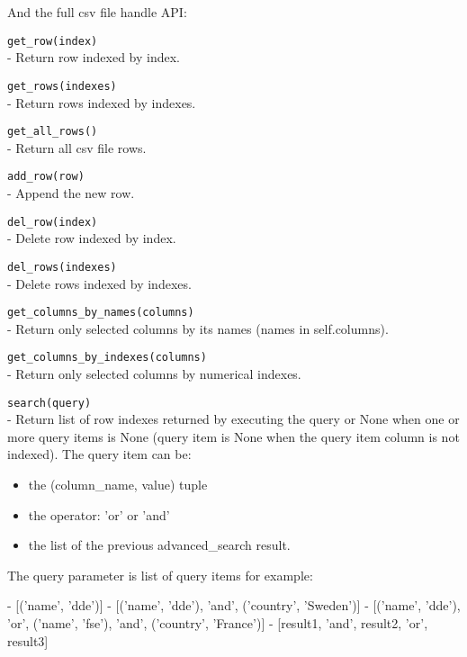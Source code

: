 \documentclass[a4paper]{book}
\begin{document}
And the full csv file handle API:
\begin{api}
  {\tt get\_row(index)}\\
  - Return row indexed by index.

  {\tt get\_rows(indexes)}\\
  - Return rows indexed by indexes.

  {\tt get\_all\_rows()}\\
  - Return all csv file rows.

  {\tt add\_row(row)}\\
  - Append the new row.

  {\tt del\_row(index)}\\
  - Delete row indexed by index.

  {\tt del\_rows(indexes)}\\
  - Delete rows indexed by indexes.

  {\tt get\_columns\_by\_names(columns)}\\
  - Return only selected columns by its names (names in self.columns).

  {\tt get\_columns\_by\_indexes(columns)}\\
  - Return only selected columns by numerical indexes.

  {\tt search(query)}\\
  - Return list of row indexes returned by executing the query
    or None when one or more query items is None (query item
    is None when the query item column is not indexed).
    The query item can be: 
    \begin{itemize}
        \item the (column\_name, value) tuple 
        \item the operator:  'or' or 'and'
        \item the list of the previous advanced\_search result.
    \end{itemize}
    
    The query parameter is list of query items for example:
    \begin{code}
    - [('name', 'dde')]
    - [('name', 'dde'), 'and', ('country', 'Sweden')]
    - [('name', 'dde'), 'or', ('name', 'fse'), 
       'and', ('country', 'France')]
    - [result1, 'and', result2, 'or', result3]
    \end{code}
\end{api}




\printindex
\end{document}
